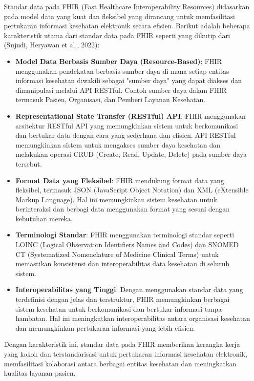Standar data pada FHIR (Fast Healthcare Interoperability Resources) didasarkan pada model data yang kuat dan fleksibel yang dirancang untuk memfasilitasi pertukaran informasi kesehatan elektronik secara efisien. Berikut adalah beberapa karakteristik utama dari standar data pada FHIR seperti yang dikutip dari (Sujudi, Heryawan et al., 2022):
\begin{itemize}
  \item \textbf{Model Data Berbasis Sumber Daya (Resource-Based)}: FHIR menggunakan pendekatan berbasis sumber daya di mana setiap entitas informasi kesehatan diwakili sebagai "sumber daya" yang dapat diakses dan dimanipulasi melalui API RESTful. Contoh sumber daya dalam FHIR termasuk Pasien, Organisasi, dan Pemberi Layanan Kesehatan.
  \item \textbf{Representational State Transfer (RESTful) API}: FHIR menggunakan arsitektur RESTful API yang memungkinkan sistem untuk berkomunikasi dan bertukar data dengan cara yang sederhana dan efisien. API RESTful memungkinkan sistem untuk mengakses sumber daya kesehatan dan melakukan operasi CRUD (Create, Read, Update, Delete) pada sumber daya tersebut.
  \item \textbf{Format Data yang Fleksibel}: FHIR mendukung format data yang fleksibel, termasuk JSON (JavaScript Object Notation) dan XML (eXtensible Markup Language). Hal ini memungkinkan sistem kesehatan untuk berinteraksi dan berbagi data menggunakan format yang sesuai dengan kebutuhan mereka.
  \item \textbf{Terminologi Standar}: FHIR menggunakan terminologi standar seperti LOINC (Logical Observation Identifiers Names and Codes) dan SNOMED CT (Systematized Nomenclature of Medicine Clinical Terms) untuk memastikan konsistensi dan interoperabilitas data kesehatan di seluruh sistem.
  \item \textbf{Interoperabilitas yang Tinggi}: Dengan menggunakan standar data yang terdefinisi dengan jelas dan terstruktur, FHIR memungkinkan berbagai sistem kesehatan untuk berkomunikasi dan bertukar informasi tanpa hambatan. Hal ini meningkatkan interoperabilitas antara organisasi kesehatan dan memungkinkan pertukaran informasi yang lebih efisien.
\end{itemize}

Dengan karakteristik ini, standar data pada FHIR memberikan kerangka kerja yang kokoh dan terstandarisasi untuk pertukaran informasi kesehatan elektronik, memfasilitasi kolaborasi antara berbagai entitas kesehatan dan meningkatkan kualitas layanan pasien.
